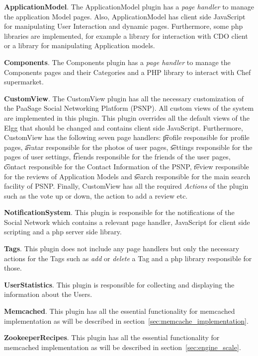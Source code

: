 \textbf{ApplicationModel}. The ApplicationModel plugin has a {\it page handler} to manage the application Model pages. Also, ApplicationModel has client side JavaScript for manipulating User Interaction and dynamic pages. Furthermore, some php libraries are implemented, for example a library for interaction with CDO client or a library for manipulating Application models. 

\textbf{Components}. The Components plugin has a {\it page handler} to manage the Components pages and their Categories and a PHP library to interact with Chef supermarket.

\textbf{CustomView}. The CustomView plugin has all the necessary customization of the PaaSage Social Networking Platform (PSNP). All custom views of the system are implemented in this plugin. This plugin overrides all the default views of the Elgg that should be changed and contains client side JavaScript. Furthermore, CustomView has the following seven page handlers: {\t profile} responsible for profile pages, {\t avatar} responsible for the photos of user pages, {\t settings} responsible for the pages of user settings, {\t friends} responsible for the friends of the user pages, {\t contact} responsible for the Contact Information of the PSNP, {\t review} responsible for the reviews of Application Models and {\t search} responsible for the main search facility of PSNP. Finally, CustomView has all the required \emph{Actions} of the plugin such as the vote up or down, the action to add a review etc.

\textbf{NotificationSystem}. This plugin is responsible for the notifications of the Social Network which contains a relevant page handler, JavaScript for client side scripting and a php server side library.

\textbf{Tags}. This plugin does not include any page handlers but only the necessary actions for the Tags such as {\it add} or {\it delete} a Tag and a php library responsible for those. 

\textbf{UserStatistics}. This plugin is responsible for collecting and displaying the information about the Users.

\textbf{Memcached}. This plugin has all the essential functionality for memcached implementation as will be described in section~\ref{sec:memcache_implementation}.

\textbf{ZookeeperRecipes}. This plugin has all the essential functionality for memcached implementation as will be described in section~\ref{sec:engine_scale}.

